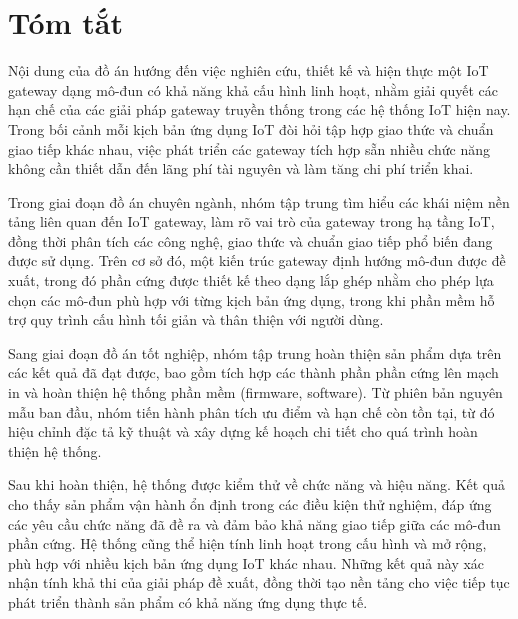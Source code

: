 \chapter*{Tóm tắt}
Nội dung của đồ án hướng đến việc nghiên cứu, thiết kế và hiện thực một IoT gateway dạng mô-đun có khả năng khả cấu hình linh hoạt, nhằm giải quyết các hạn chế của các giải pháp gateway truyền thống trong các hệ thống IoT hiện nay. Trong bối cảnh mỗi kịch bản ứng dụng IoT đòi hỏi tập hợp giao thức và chuẩn giao tiếp khác nhau, việc phát triển các gateway tích hợp sẵn nhiều chức năng không cần thiết dẫn đến lãng phí tài nguyên và làm tăng chi phí triển khai.

Trong giai đoạn đồ án chuyên ngành, nhóm tập trung tìm hiểu các khái niệm nền tảng liên quan đến IoT gateway, làm rõ vai trò của gateway trong hạ tầng IoT, đồng thời phân tích các công nghệ, giao thức và chuẩn giao tiếp phổ biến đang được sử dụng. Trên cơ sở đó, một kiến trúc gateway định hướng mô-đun được đề xuất, trong đó phần cứng được thiết kế theo dạng lắp ghép nhằm cho phép lựa chọn các mô-đun phù hợp với từng kịch bản ứng dụng, trong khi phần mềm hỗ trợ quy trình cấu hình tối giản và thân thiện với người dùng.

Sang giai đoạn đồ án tốt nghiệp, nhóm tập trung hoàn thiện sản phẩm dựa trên các kết quả đã đạt được, bao gồm tích hợp các thành phần phần cứng lên mạch in và hoàn thiện hệ thống phần mềm (firmware, software). Từ phiên bản nguyên mẫu ban đầu, nhóm tiến hành phân tích ưu điểm và hạn chế còn tồn tại, từ đó hiệu chỉnh đặc tả kỹ thuật và xây dựng kế hoạch chi tiết cho quá trình hoàn thiện hệ thống.

Sau khi hoàn thiện, hệ thống được kiểm thử về chức năng và hiệu năng. Kết quả cho thấy sản phẩm vận hành ổn định trong các điều kiện thử nghiệm, đáp ứng các yêu cầu chức năng đã đề ra và đảm bảo khả năng giao tiếp giữa các mô-đun phần cứng. Hệ thống cũng thể hiện tính linh hoạt trong cấu hình và mở rộng, phù hợp với nhiều kịch bản ứng dụng IoT khác nhau. Những kết quả này xác nhận tính khả thi của giải pháp đề xuất, đồng thời tạo nền tảng cho việc tiếp tục phát triển thành sản phẩm có khả năng ứng dụng thực tế.